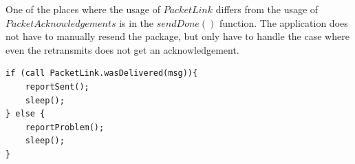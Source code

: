 One of the places where the usage of $PacketLink$ differs from the usage of
$PacketAcknowledgements$ is in the $sendDone()$ function. The application does
not have to manually resend the package, but only have to handle the case where
even the retransmits does not get an acknowledgement.

\begin{lstlisting}[caption={TemperatureC.nc $\rightarrow$ AMSend.sendDone()}]
if (call PacketLink.wasDelivered(msg)){
    reportSent();
    sleep();
} else {
    reportProblem();
    sleep();
}
\end{lstlisting}


